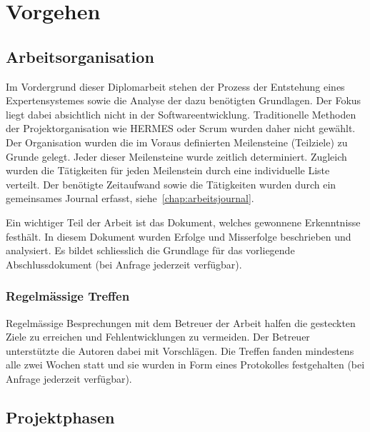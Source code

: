 \chapter{Vorgehen}
\label{chap:vorgehen}

\section{Arbeitsorganisation}
\label{sec:vorgehen_orga}
Im Vordergrund dieser Diplomarbeit stehen der Prozess der Entstehung eines Expertensystemes sowie die Analyse der dazu benötigten Grundlagen. Der Fokus liegt dabei absichtlich nicht in der Softwareentwicklung. Traditionelle Methoden der Projektorganisation wie HERMES oder Scrum wurden daher nicht gewählt.\\
Der Organisation wurden die im Voraus definierten Meilensteine (Teilziele) zu Grunde gelegt. Jeder dieser Meilensteine wurde zeitlich determiniert. Zugleich wurden die Tätigkeiten für jeden Meilenstein durch eine individuelle Liste verteilt. Der benötigte Zeitaufwand sowie die Tätigkeiten wurden durch ein gemeinsames Journal erfasst, siehe~\ref{chap:arbeitsjournal}.

Ein wichtiger Teil der Arbeit ist das Dokument, welches gewonnene Erkenntnisse festhält. In diesem Dokument wurden Erfolge und Misserfolge beschrieben und analysiert. Es bildet schliesslich die Grundlage für das vorliegende Abschlussdokument (bei Anfrage jederzeit verfügbar).

\subsection{Regelmässige Treffen}
\label{sec:vorgehen_orga_treffen}
Regelmässige Besprechungen mit dem Betreuer der Arbeit halfen die gesteckten Ziele zu erreichen und Fehlentwicklungen zu vermeiden. Der Betreuer unterstützte die Autoren dabei mit Vorschlägen. Die Treffen fanden mindestens alle zwei Wochen statt und sie wurden in Form eines Protokolles festgehalten (bei Anfrage jederzeit verfügbar).

\section{Projektphasen}
\label{sec:projektphasen}

